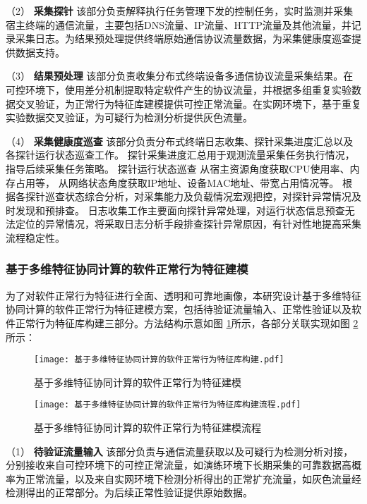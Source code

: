（2） \textbf{采集探针}\quad
该部分负责解释执行任务管理下发的控制任务，实时监测并采集宿主终端的通信流量，主要包括DNS流量、IP流量、HTTP流量及其他流量，并记录采集日志。为结果预处理提供终端原始通信协议流量数据，为采集健康度巡查提供数据支持。

（3） \textbf{结果预处理}\quad
该部分负责收集分布式终端设备多通信协议流量采集结果。在可控环境下，使用差分机制提取特定软件产生的协议流量，并根据多组重复实验数据交叉验证，为正常行为特征库建模提供可控正常流量。在实网环境下，基于重复实验数据交叉验证，为可疑行为检测分析提供灰色流量。

（4） \textbf{采集健康度巡查}\quad
该部分负责分布式终端日志收集、探针采集进度汇总以及各探针运行状态巡查工作。
探针采集进度汇总用于观测流量采集任务执行情况，指导后续采集任务策略。
探针运行状态巡查
从宿主资源角度获取CPU使用率、内存占用等，
从网络状态角度获取IP地址、设备MAC地址、带宽占用情况等。
根据各探针巡查状态综合分析，对采集能力及负载情况宏观把控，对探针异常情况及时发现和预排查。
日志收集工作主要面向探针异常处理，对运行状态信息预查无法定位的异常情况，将采取日志分析手段排查探针异常原因，有针对性地提高采集流程稳定性。

\FloatBarrier
\subsubsection{基于多维特征协同计算的软件正常行为特征建模}
\FloatBarrier
为了对软件正常行为特征进行全面、透明和可靠地画像，本研究设计基于多维特征协同计算的软件正常行为特征建模方案，包括待验证流量输入、正常性验证以及软件正常行为特征库构建三部分。方法结构示意如图 \ref{fig:基于多维特征协同计算的软件正常行为特征建模}所示，各部分关联实现如图 \ref{fig:基于多维特征协同计算的软件正常行为特征库构建流程}所示：
 
 
\begin{figure}[ht]
  \centering
  \texttt{[image: 基于多维特征协同计算的软件正常行为特征库构建.pdf]}
  \caption{基于多维特征协同计算的软件正常行为特征建模}
  \label{fig:基于多维特征协同计算的软件正常行为特征建模}
\end{figure} 

\begin{figure}[ht]
  \centering
  \texttt{[image: 基于多维特征协同计算的软件正常行为特征库构建流程.pdf]}
  \caption{基于多维特征协同计算的软件正常行为特征建模流程}
  \label{fig:基于多维特征协同计算的软件正常行为特征库构建流程}
\end{figure} 


（1） \textbf{待验证流量输入}\quad
该部分负责与通信流量获取以及可疑行为检测分析对接，分别接收来自可控环境下的可控正常流量，如演练环境下长期采集的可靠数据高概率为正常流量，以及来自实网环境下检测分析得出的正常扩充流量，如灰色流量经检测得出的正常部分。为后续正常性验证提供原始数据。

